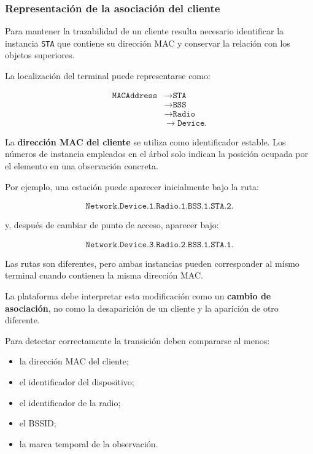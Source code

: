 \subsubsection*{Representación de la asociación del cliente}

Para mantener la trazabilidad de un cliente resulta necesario identificar
la instancia \texttt{STA} que contiene su dirección MAC y conservar la
relación con los objetos superiores.

La localización del terminal puede representarse como:

\[
\begin{aligned}
    \texttt{MACAddress}
    &\longrightarrow \texttt{STA}\\
    &\longrightarrow \texttt{BSS}\\
    &\longrightarrow \texttt{Radio}\\
    &\longrightarrow \texttt{Device}.
\end{aligned}
\]

La \textbf{dirección MAC del cliente} se utiliza como identificador
estable. Los números de instancia empleados en el árbol solo indican la
posición ocupada por el elemento en una observación concreta.

Por ejemplo, una estación puede aparecer inicialmente bajo la ruta:

\[
\begin{split}
    \texttt{Network.Device.1.Radio.1.BSS.1.STA.2.}
\end{split}
\]

y, después de cambiar de punto de acceso, aparecer bajo:

\[
\begin{split}
    \texttt{Network.Device.3.Radio.2.BSS.1.STA.1.}
\end{split}
\]

Las rutas son diferentes, pero ambas instancias pueden corresponder al
mismo terminal cuando contienen la misma dirección MAC.

La plataforma debe interpretar esta modificación como un
\textbf{cambio de asociación}, no como la desaparición de un cliente y la
aparición de otro diferente.

Para detectar correctamente la transición deben compararse al menos:

\begin{itemize}
    \item la dirección MAC del cliente;
    \item el identificador del dispositivo;
    \item el identificador de la radio;
    \item el BSSID;
    \item la marca temporal de la observación.
\end{itemize}

